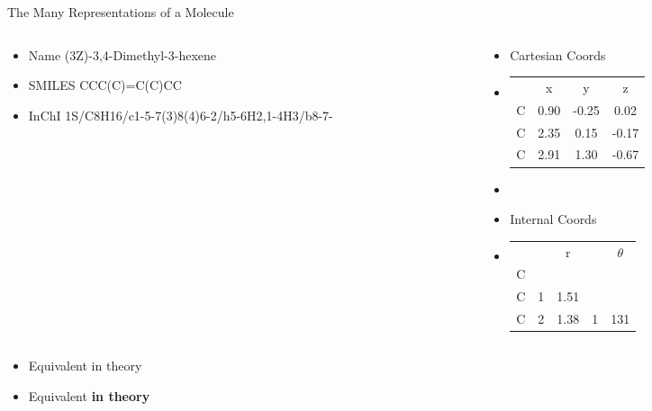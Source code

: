 \documentclass[10pt]{beamer}
\begin{document}
{\begin{frame}{The Many Representations of a Molecule}
\begin{columns}[c]
    \begin{column}{0.3\textwidth}
      \begin{itemize}
		   \item[] {\alert{Name} \mbox{(3Z)-3,4-Dimethyl}-3-hexene}
		   \item[] {\alert{SMILES} CCC(C)=C(C)CC}
		   \item[] {\alert{InChI} 1S/C8H16/c1-5-7(3)8(4)6-2/h5-6H2,1-4H3/b8-7-}
      \end{itemize}
    \end{column}

    \begin{column}{0.45\textwidth}
        \begin{itemize}
      \item[] {\alert{Cartesian Coords}}
      \item[] {
        \begin{tabular}{l c c c}
              &         x    &       y     &      z  \\
          C   &       0.90   &    -0.25    &    0.02 \\
          C   &       2.35   &     0.15    &   -0.17 \\
          C   &       2.91   &     1.30    &   -0.67 \\
        \end{tabular}
        }
          \item[]{}
          \item[] {\alert{Internal Coords}}
          \item[] {
            \begin{tabular}{l c c c c}
              &   &   r  &   &  $\theta$ \\
            C &   &      &   &           \\
            C & 1 & 1.51 &   &           \\
            C & 2 & 1.38 & 1 & 131       \\
            \end{tabular}
          }
          \end{itemize}
    \end{column}
  \end{columns}
  \begin{itemize}
    \item[]<only@2> {Equivalent in theory}
    \item[]<only@3> {Equivalent \alert{\textbf{in theory}}}
  \end{itemize}
\end{frame}

}
\end{document}
